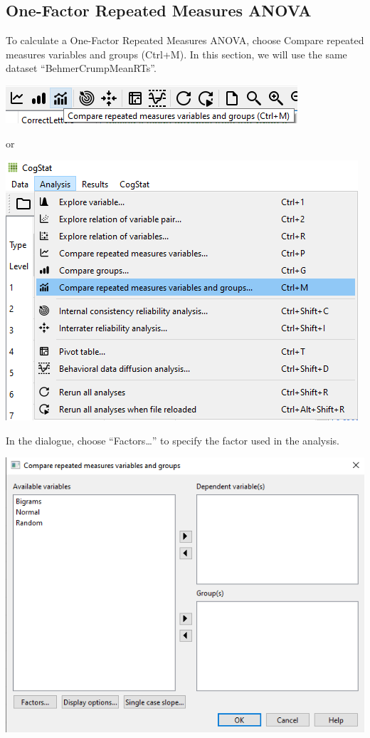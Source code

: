 \documentclass[
]{book}
\begin{document}
\hypertarget{one-factor-repeated-measures-anova}{%
\subsection{One-Factor Repeated Measures ANOVA}\label{one-factor-repeated-measures-anova}}

To calculate a One-Factor Repeated Measures ANOVA, choose Compare repeated measures variables and groups (Ctrl+M). In this section, we will use the same dataset ``BehmerCrumpMeanRTs''.

\includegraphics{img/ch9/9.4CRMVAG_icon.png}

or

\includegraphics{img/ch9/9.4CRMVAG_menu.png}

In the dialogue, choose ``Factors\ldots{}'' to specify the factor used in the analysis.

\includegraphics{img/ch9/9.4CRMVAG_window.png}
\end{document}
